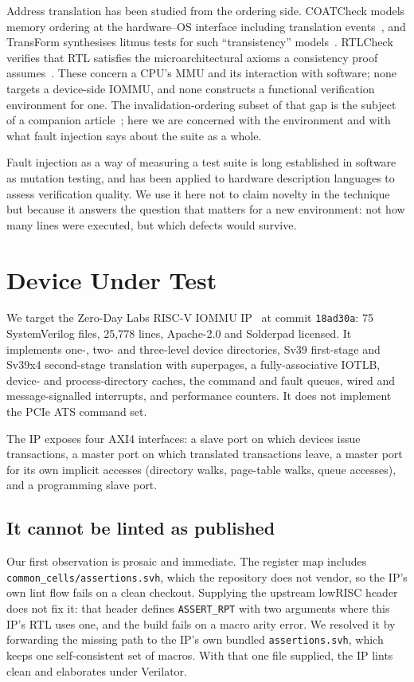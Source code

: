 \documentclass[journal]{IEEEtran}
\begin{document}
Address translation has been studied from the ordering side. COATCheck models
memory ordering at the hardware--OS interface including translation
events~\cite{coatcheck}, and TransForm synthesises litmus tests for such
``transistency'' models~\cite{transform}. RTLCheck verifies that RTL satisfies
the microarchitectural axioms a consistency proof
assumes~\cite{rtlcheck}. These concern a CPU's MMU and its interaction with
software; none targets a device-side IOMMU, and none constructs a functional
verification environment for one. The invalidation-ordering subset of that gap
is the subject of a companion article~\cite{companionB}; here we are concerned
with the environment and with what fault injection says about the suite as a
whole.

Fault injection as a way of measuring a test suite is long established in
software as mutation testing, and has been applied to hardware description
languages to assess verification quality. We use it here not to claim novelty in
the technique but because it answers the question that matters for a new
environment: not how many lines were executed, but which defects would survive.

\section{Device Under Test}
We target the Zero-Day Labs RISC-V IOMMU IP~\cite{rviommu} at commit
\texttt{18ad30a}: 75 SystemVerilog files, 25{,}778 lines, Apache-2.0 and
Solderpad licensed. It implements one-, two- and three-level device directories,
Sv39 first-stage and Sv39x4 second-stage translation with superpages, a
fully-associative IOTLB, device- and process-directory caches, the command and
fault queues, wired and message-signalled interrupts, and performance counters.
It does not implement the PCIe ATS command set.

The IP exposes four AXI4 interfaces: a slave port on which devices issue
transactions, a master port on which translated transactions leave, a master
port for its own implicit accesses (directory walks, page-table walks, queue
accesses), and a programming slave port.

\subsection{It cannot be linted as published}
Our first observation is prosaic and immediate. The register map includes
\texttt{common\_cells/assertions.svh}, which the repository does not vendor, so
the IP's own lint flow fails on a clean checkout. Supplying the upstream
lowRISC header does not fix it: that header defines \texttt{ASSERT\_RPT} with
two arguments where this IP's RTL uses one, and the build fails on a macro
arity error. We resolved it by forwarding the missing path to the IP's own
bundled \texttt{assertions.svh}, which keeps one self-consistent set of macros.
With that one file supplied, the IP lints clean and elaborates under Verilator.
\end{document}
